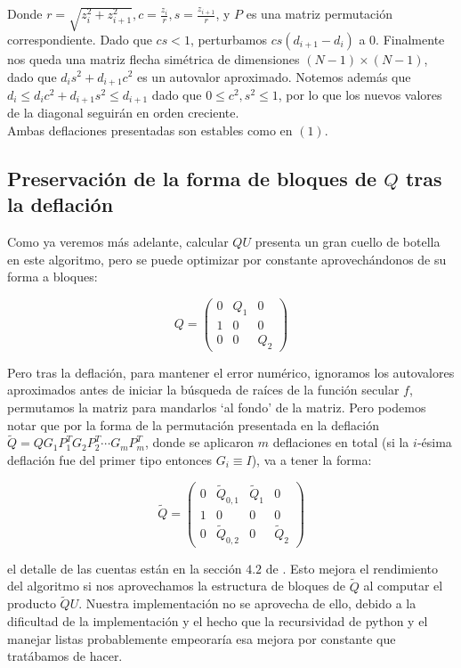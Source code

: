 \documentclass[11pt,a4paper]{article}
\begin{document}
Donde $r=\sqrt{z_i^2 +z_{i+1}^2}, c=\frac{z_i}r , s=\frac{z_{i+1}}r$, y $P$ es una matriz permutación correspondiente. Dado que $cs<1$, perturbamos $cs(d_{i+1}-d_i)$ a $0$. Finalmente nos queda una matriz flecha simétrica de dimensiones $(N-1) \times (N-1)$, dado que $d_i s^2+d_{i+1} c^2$ es un autovalor aproximado. Notemos además que $d_i \leq d_i c^2+d_{i+1} s^2 \leq d_{i+1}$ dado que $0 \leq c^2,s^2 \leq 1$, por lo que los nuevos valores de la diagonal seguirán en orden creciente.\\

Ambas deflaciones presentadas son estables como en $(1)$.

\subsection{Preservación de la forma de bloques de $Q$ tras la deflación}

Como ya veremos más adelante, calcular $QU$ presenta un gran cuello de botella en este algoritmo, pero se puede optimizar por constante aprovechándonos de su forma a bloques:

$$Q=\begin{pmatrix}
        0 & Q_1 & 0 \\
        1 & 0 & 0 \\
        0 & 0 & Q_2  
\end{pmatrix}$$

Pero tras la deflación, para mantener el error numérico, ignoramos los autovalores aproximados antes de iniciar la búsqueda de raíces de la función secular $f$, permutamos la matriz para mandarlos `al fondo' de la matriz. Pero podemos notar que por la forma de la permutación presentada en la deflación  $\tilde{Q}=Q G_1P^T_1 G_2P^T_2 \cdots G_mP^T_m$, donde se aplicaron $m$ deflaciones en total (si la $i$-ésima deflación fue del primer tipo entonces $G_i \equiv I$), va a tener la forma:

$$\tilde{Q}=\begin{pmatrix} 
    0 & \tilde{Q}_{0,1} & \tilde{Q}_1 & 0 \\
    1 & 0 & 0 & 0 \\
    0 & \tilde{Q}_{0,2} & 0 & \tilde{Q}_2
\end{pmatrix}$$

el detalle de las cuentas están en la sección $4.2$ de \cite{gu1995}. Esto mejora el rendimiento del algoritmo si nos aprovechamos la estructura de bloques de $\tilde{Q}$ al computar el producto $\tilde{Q}U$. Nuestra implementación no se aprovecha de ello, debido a la dificultad de la implementación y el hecho que la recursividad de python y el manejar listas probablemente empeoraría esa mejora por constante que tratábamos de hacer.\\
\end{document}
